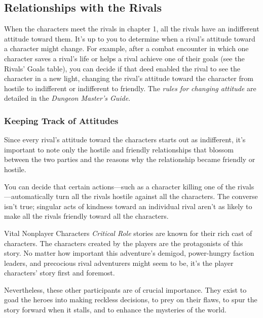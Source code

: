 \documentclass[10pt,a4paper,twoside,bg=print,twocolumn,openany,nodeprecatedcode]{dndbook}
\begin{document}
\subsection{Relationships with the Rivals}
When the characters meet the rivals in chapter 1, all the rivals have an indifferent attitude toward them. It's up to you to determine when a rival's attitude toward a character might change. For example, after a combat encounter in which one character saves a rival's life or helps a rival achieve one of their goals (see the Rivals' Goals table), you can decide if that deed enabled the rival to see the character in a new light, changing the rival's attitude toward the character from hostile to indifferent or indifferent to friendly. The \textit{rules for changing attitude} are detailed in the \textit{Dungeon Master's Guide}.

\subsubsection{Keeping Track of Attitudes}
Since every rival's attitude toward the characters starts out as indifferent, it's important to note only the hostile and friendly relationships that blossom between the two parties and the reasons why the relationship became friendly or hostile.

You can decide that certain actions—such as a character killing one of the rivals—automatically turn all the rivals hostile against all the characters. The converse isn't true; singular acts of kindness toward an individual rival aren't as likely to make all the rivals friendly toward all the characters.

\begin{DndSidebar}[float=!b]{Vital Nonplayer Characters}
\textit{Critical Role} stories are known for their rich cast of characters. The characters created by the players are the protagonists of this story. No matter how important this adventure's demigod, power-hungry faction leaders, and precocious rival adventurers might seem to be, it's the player characters' story first and foremost.



Nevertheless, these other participants are of crucial importance. They exist to goad the heroes into making reckless decisions, to prey on their flaws, to spur the story forward when it stalls, and to enhance the mysteries of the world.



\end{DndSidebar}
\end{document}
